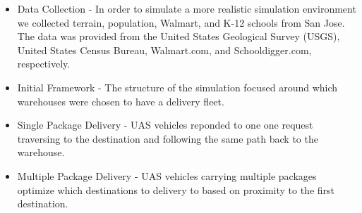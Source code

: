 
\begin{itemize}
\item{Data Collection - In order to simulate a more realistic simulation environment we collected terrain, population, Walmart, and K-12 schools from San Jose. The data was provided from the United States Geological Survey (USGS), United States Census Bureau, Walmart.com, and Schooldigger.com, respectively.}
\item{Initial Framework - The structure of the simulation focused around which warehouses were chosen to have a delivery fleet.}
\item{Single Package Delivery - UAS vehicles reponded to one one request traversing to the destination and following the same path back to the warehouse.}
\item{Multiple Package Delivery - UAS vehicles carrying multiple packages optimize which destinations to delivery to based on proximity to the first destination.}
\end{itemize}
